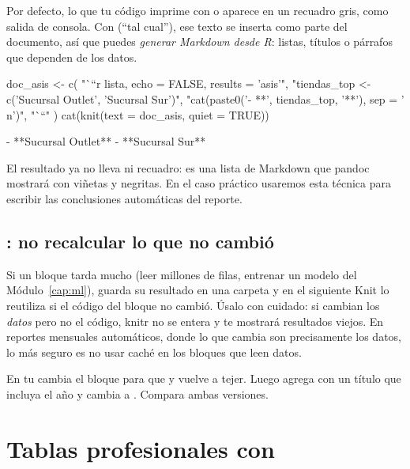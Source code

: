 Por defecto, lo que tu código imprime con  o 
aparece en un recuadro gris, como salida de consola. Con
 (``tal cual''), ese texto se inserta como parte del
documento, así que puedes \emph{generar Markdown desde R}: listas, títulos o
párrafos que dependen de los datos.

\begin{rcode}
doc_asis <- c(
  "```{r lista, echo = FALSE, results = 'asis'}",
  "tiendas_top <- c('Sucursal Outlet', 'Sucursal Sur')",
  "cat(paste0('- **', tiendas_top, '**'), sep = '\\n')",
  "```"
)
cat(knit(text = doc_asis, quiet = TRUE))
\end{rcode}
\begin{rsalida}
- **Sucursal Outlet**
- **Sucursal Sur**
\end{rsalida}

El resultado ya no lleva \codigo{\#\#} ni recuadro: es una lista de Markdown
que pandoc mostrará con viñetas y negritas. En el caso práctico usaremos esta
técnica para escribir las conclusiones automáticas del reporte.

\subsection{\texorpdfstring{}{cache}: no recalcular lo que no
cambió}

Si un bloque tarda mucho (leer millones de filas, entrenar un modelo del
Módulo~\ref{cap:ml}),  guarda su resultado en una
carpeta  y en el siguiente Knit lo reutiliza si el código
del bloque no cambió. Úsalo con cuidado: si cambian los \emph{datos} pero no
el código, knitr no se entera y te mostrará resultados viejos. En reportes
mensuales automáticos, donde lo que cambia son precisamente los datos, lo
más seguro es no usar caché en los bloques que leen datos.

\begin{hazlotu}
En tu  cambia el bloque  para
que  y vuelve a tejer. Luego agrega
 con un título que incluya el año y cambia
 a . Compara ambas versiones.
\end{hazlotu}

\section{\texorpdfstring{Tablas profesionales con }{Tablas profesionales con knitr::kable()}}
\label{sec:m8-kable}

